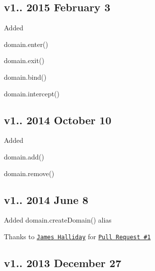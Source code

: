 \subsection*{v1.. 2015 February 3}


\begin{DoxyItemize}
\item Added
\begin{DoxyItemize}
\item {\ttfamily domain.\+enter()}
\item {\ttfamily domain.\+exit()}
\item {\ttfamily domain.\+bind()}
\item {\ttfamily domain.\+intercept()}
\end{DoxyItemize}
\end{DoxyItemize}

\subsection*{v1.. 2014 October 10}


\begin{DoxyItemize}
\item Added
\begin{DoxyItemize}
\item {\ttfamily domain.\+add()}
\item {\ttfamily domain.\+remove()}
\end{DoxyItemize}
\end{DoxyItemize}

\subsection*{v1.. 2014 June 8}


\begin{DoxyItemize}
\item Added {\ttfamily domain.\+create\+Domain()} alias
\begin{DoxyItemize}
\item Thanks to \href{https://github.com/substack}{\tt James Halliday} for \href{https://github.com/bevry/domain-browser/pull/1}{\tt Pull Request \#1}
\end{DoxyItemize}
\end{DoxyItemize}

\subsection*{v1.. 2013 December 27}


